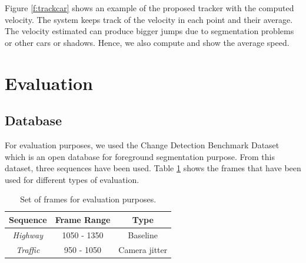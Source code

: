 \documentclass{article}
\begin{document}
Figure \ref{f:trackcar} shows an example of the proposed tracker with the computed velocity. The system keeps track of the velocity in each point and their average. The velocity estimated can produce bigger jumps due to segmentation problems or other cars or shadows. Hence, we also compute and show the average speed.

\section{Evaluation} \label{sec:eval}
\subsection{Database}
\label{subsec:database}

For evaluation purposes, we used the Change Detection Benchmark Dataset \cite{wang2014cdnet} which is an open database for foreground segmentation purpose. From this dataset, three sequences have been used. Table \ref{t:dataset} shows the frames that have been used for different types of evaluation.

\begin{table}
  \begin{center}
  	\caption{Set of frames for evaluation purposes.}
    \label{t:dataset}
    \begin{tabular}{c | c | c}
      \textbf{Sequence} & \textbf{Frame Range} & \textbf{Type}\\
      \hline
      \emph{Highway} & 1050 - 1350 & Baseline\\
      \emph{Traffic} & 950 - 1050 & Camera jitter\\
    \end{tabular}
  \end{center}
\end{table}



\end{document}
